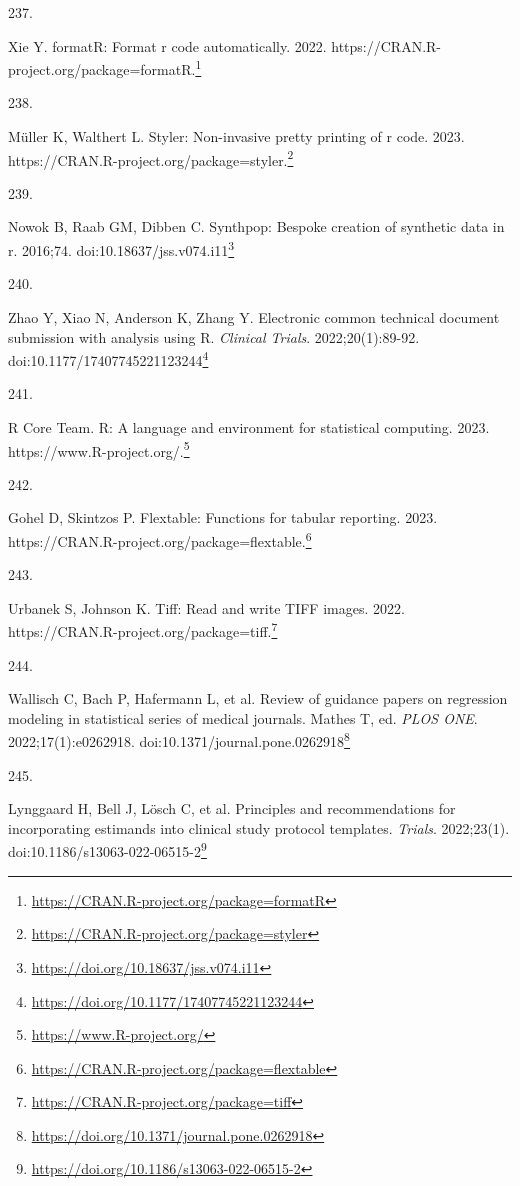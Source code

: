 \documentclass[
  a4paper,
]{book}
\newlength{\cslhangindent}
\newlength{\csllabelwidth}
\newlength{\cslentryspacingunit} %
\newenvironment{CSLReferences}[2] %
 {%
  \setlength{\parindent}{0pt}
  \ifodd #1
  \let\oldpar\par
  \def\par{\hangindent=\cslhangindent\oldpar}
  \fi
  \setlength{\parskip}{#2\cslentryspacingunit}
 }%
 {}
\newcommand{\CSLLeftMargin}[1]{\parbox[t]{\csllabelwidth}{#1}}
\newcommand{\CSLRightInline}[1]{\parbox[t]{\linewidth - \csllabelwidth}{#1}\break}
\renewcommand{\href}[2]{#2\footnote{\url{#1}}}
\begin{document}
\begin{CSLReferences}{0}{0}
\leavevmode{}%
\CSLLeftMargin{237. }%
\CSLRightInline{Xie Y. formatR: Format r code automatically. 2022. \href{https://CRAN.R-project.org/package=formatR}{https://CRAN.R-project.org/package=formatR.}}

\leavevmode{}%
\CSLLeftMargin{238. }%
\CSLRightInline{Müller K, Walthert L. Styler: Non-invasive pretty printing of r code. 2023. \href{https://CRAN.R-project.org/package=styler}{https://CRAN.R-project.org/package=styler.}}

\leavevmode{}%
\CSLLeftMargin{239. }%
\CSLRightInline{Nowok B, Raab GM, Dibben C. {\textbraceleft}Synthpop{\textbraceright}: Bespoke creation of synthetic data in {\textbraceleft}r{\textbraceright}. 2016;74. doi:\href{https://doi.org/10.18637/jss.v074.i11}{10.18637/jss.v074.i11}}

\leavevmode{}%
\CSLLeftMargin{240. }%
\CSLRightInline{Zhao Y, Xiao N, Anderson K, Zhang Y. Electronic common technical document submission with analysis using R. \emph{Clinical Trials}. 2022;20(1):89-92. doi:\href{https://doi.org/10.1177/17407745221123244}{10.1177/17407745221123244}}

\leavevmode{}%
\CSLLeftMargin{241. }%
\CSLRightInline{R Core Team. R: A language and environment for statistical computing. 2023. \href{https://www.R-project.org/}{https://www.R-project.org/.}}

\leavevmode{}%
\CSLLeftMargin{242. }%
\CSLRightInline{Gohel D, Skintzos P. Flextable: Functions for tabular reporting. 2023. \href{https://CRAN.R-project.org/package=flextable}{https://CRAN.R-project.org/package=flextable.}}

\leavevmode{}%
\CSLLeftMargin{243. }%
\CSLRightInline{Urbanek S, Johnson K. Tiff: Read and write TIFF images. 2022. \href{https://CRAN.R-project.org/package=tiff}{https://CRAN.R-project.org/package=tiff.}}

\leavevmode{}%
\CSLLeftMargin{244. }%
\CSLRightInline{Wallisch C, Bach P, Hafermann L, et al. Review of guidance papers on regression modeling in statistical series of medical journals. Mathes T, ed. \emph{PLOS ONE}. 2022;17(1):e0262918. doi:\href{https://doi.org/10.1371/journal.pone.0262918}{10.1371/journal.pone.0262918}}

\leavevmode{}%
\CSLLeftMargin{245. }%
\CSLRightInline{Lynggaard H, Bell J, Lösch C, et al. Principles and recommendations for incorporating estimands into clinical study protocol templates. \emph{Trials}. 2022;23(1). doi:\href{https://doi.org/10.1186/s13063-022-06515-2}{10.1186/s13063-022-06515-2}}


\end{CSLReferences}
\end{document}

